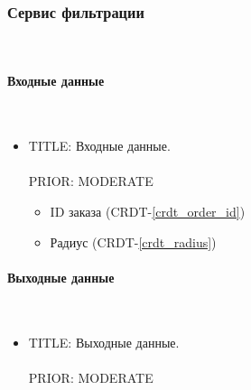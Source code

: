 \subsubsection{Сервис фильтрации} \mbox{} \\ \label{driver_filters_taxi_service}

      \paragraph{Входные данные} \mbox{} \\ \label{driver_filters_taxi_service_input_data}

        \begin{itemize}

          \item{

            TITLE: Входные данные.\\
            \\
            PRIOR: MODERATE\\

          }

          \begin{itemize}
            \item ID заказа (CRDT-\ref{crdt_order_id})
            \item Радиус (CRDT-\ref{crdt_radius})
          \end{itemize}

        \end{itemize}

      \paragraph{Выходные данные} \mbox{} \\

        \begin{itemize}

          \item{

            TITLE: Выходные данные.\\
            \\
            PRIOR: MODERATE\\

          }

        \end{itemize}

